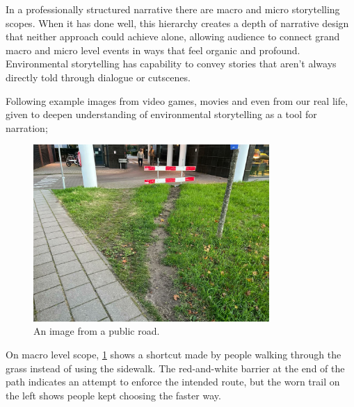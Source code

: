     In a professionally structured narrative there are macro and micro storytelling scopes\cite{Liminal_Space_Between_Embedded_and_Emergent_Narrative}. When it has done well, this hierarchy creates a depth of narrative design that neither approach could achieve alone, allowing audience to connect grand macro and micro level events in ways that feel organic and profound\cite{Environmental_Storytelling_Blogpost}. Environmental storytelling has capability to convey stories that aren’t always directly told through dialogue or cutscenes.\par

    Following example images from video games, movies and even from our real life, given to deepen understanding of environmental storytelling as a tool for narration;

    \begin{figure}[H]
    \centering
    \includegraphics[width=0.8\textwidth]{images/environmental_storytelling_02}
    \caption{An image from a public road.}
    \label{fig:ES_01}
    \end{figure}

    On macro level scope, \ref{fig:ES_01} shows a shortcut made by people walking through the grass instead of using the sidewalk. The red-and-white barrier at the end of the path indicates an attempt to enforce the intended route, but the worn trail on the left shows people kept choosing the faster way.\par

